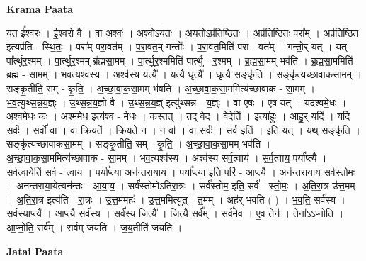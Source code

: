 \documentclass[17pt]{extarticle}
\begin{document}
\textbf{Krama Paata} \newline

य॒त ई᳚श्व॒रः । ई॒श्व॒रो वै । वा अश्वः॑ । अश्वोऽय॑तः । अय॒तोऽप्र॑तिष्ठितः । अप्र॑तिष्ठितः॒ परा᳚म् । अप्र॑तिष्ठित॒ इत्यप्र॑ति - स्थि॒तः॒ । परा᳚म् परा॒वत᳚म् । प॒रा॒वत॒म् गन्तोः᳚ । प॒रा॒वत॒मिति॑ परा - वत᳚म् । गन्तो॒र् यत् । यत् पा᳚र्त्थुर॒श्मम् । पा॒र्त्थु॒र॒श्मम् ब्र॑ह्मसा॒मम् । पा॒र्त्थु॒र॒श्ममिति॑ पार्त्थु - र॒श्मम् । ब्र॒ह्म॒सा॒मम् भव॑ति । ब्र॒ह्म॒सा॒ममिति॑ ब्रह्म - सा॒मम् । भव॒त्यश्व॑स्य । अश्व॑स्य॒ यत्यै᳚ । यत्यै॒ धृत्यै᳚ । धृत्यै॒ सङ्कृ॑ति । सङ्कृ॑त्यच्छावाकसा॒मम् । सङ्कृ॒तीति॒ सम् - कृ॒ति॒ । अ॒च्छा॒वा॒क॒सा॒मम् भ॑वति । अ॒च्छा॒वा॒क॒सा॒ममित्य॑च्छावाक - सा॒मम् । भ॒व॒त्यु॒थ्स॒न्न॒य॒ज्ञ्ः । उ॒थ्स॒न्न॒य॒ज्ञो वै । उ॒थ्स॒न्न॒य॒ज्ञ् इत्यु॑थ्सन्न - य॒ज्ञ्ः । वा ए॒षः । ए॒ष यत् । यद॑श्वमे॒धः । अ॒श्व॒मे॒धः कः । अ॒श्म॒मे॒ध इत्य॑श्व - मे॒धः । कस्तत् । तद् वे॑द । वे॒देति॑ । इत्या॑हुः । आ॒हु॒र् यदि॑ । यदि॒ सर्वः॑ । सर्वो॑ वा । वा॒ क्रि॒यते᳚ । क्रि॒यते॒ न । न वा᳚ । वा॒ सर्वः॑ । सर्व॒ इति॑ । इति॒ यत् । यथ् सङ्कृ॑ति । सङ्कृ॑त्यच्छावाकसा॒मम् । सङ्कृ॒तीति॒ सम् - कृ॒ति॒ । अ॒च्छा॒वा॒क॒सा॒मम् भव॑ति । अ॒च्छा॒वा॒क॒सा॒ममित्य॑च्छावाक - सा॒मम् । भव॒त्यश्व॑स्य । अश्व॑स्य सर्व॒त्वाय॑ । स॒र्व॒त्वाय॒ पर्या᳚प्त्यै । स॒र्व॒त्वायेति॑ सर्व - त्वाय॑ । पर्या᳚प्त्या॒ अन॑न्तरायाय । पर्या᳚प्त्या॒ इति॒ परि॑ - आ॒प्त्यै॒ । अन॑न्तरायाय॒ सर्व॑स्तोमः । अन॑न्तराया॒येत्यन॑न्तः - आ॒या॒य॒ । सर्व॑स्तोमोऽतिरा॒त्रः । सर्व॑स्तोम॒ इति॒ सर्व॑ - स्तो॒मः॒ । अ॒ति॒रा॒त्र उ॑त्त॒मम् । अ॒ति॒रा॒त्र इत्य॑ति - रा॒त्रः । उ॒त्त॒ममहः॑ । उ॒त्त॒ममित्यु॑त् - त॒मम् । अह॑र् भवति ( ) । भ॒व॒ति॒ सर्व॑स्य । सर्व॒स्याप्त्यै᳚ । आप्त्यै॒ सर्व॑स्य । सर्व॑स्य॒ जित्यै᳚ । जित्यै॒ सर्व᳚म् । सर्व॑मे॒व । ए॒व तेन॑ । तेना᳚ऽऽप्नोति । आ॒प्नो॒ति॒ सर्व᳚म् । सर्व॑म् जयति । ज॒य॒तीति॑ जयति । \newline

\textbf{Jatai Paata} \newline
\end{document}
